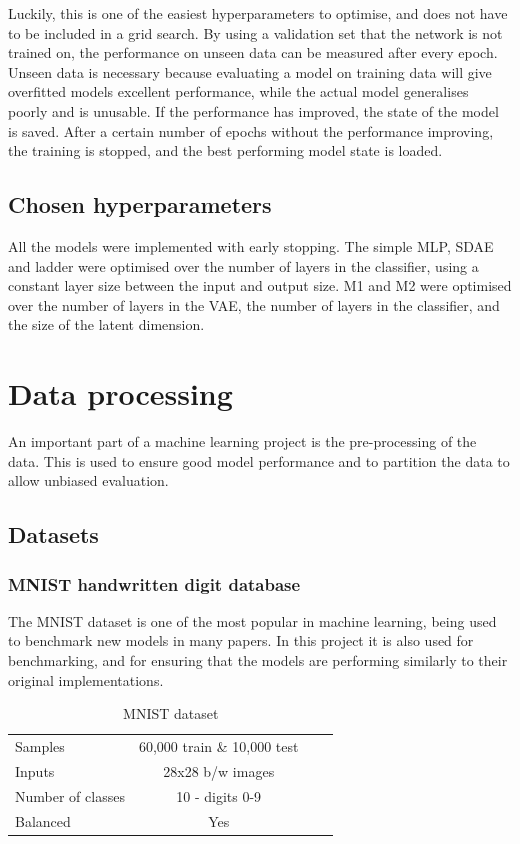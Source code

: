 Luckily, this is one of the easiest hyperparameters to optimise, and does not have to be included in a grid search. 
By using a validation set that the network is not trained on, the performance on unseen data can be measured after 
every epoch. Unseen data is necessary because evaluating a model on training data will give overfitted models excellent performance, 
while the actual model generalises poorly and is unusable.
If the performance has improved, the state of the model is saved. After a certain number of epochs without the performance improving, 
the training is stopped, and the best performing model state is loaded.

\subsection{Chosen hyperparameters}

All the models were implemented with early stopping. The simple MLP, SDAE and ladder were optimised over the number of layers in the classifier, 
using a constant layer size between the input and output size. M1 and M2 were optimised over the number of layers in the VAE, the 
number of layers in the classifier, and the size of the latent dimension.

\section{Data processing}
An important part of a machine learning project is the pre-processing of the data. This is used to ensure good model performance and 
to partition the data to allow unbiased evaluation.

\subsection{Datasets}
\subsubsection{MNIST handwritten digit database}
The MNIST dataset is one of the most popular in machine learning, being used to benchmark new models in many papers. In this project it is 
also used for benchmarking, and for ensuring that the models are performing similarly to their original implementations.
\begin{table}[H]
  \label{tab:mnist}
  \small %
  \centering %
  \begin{tabular}{lccr} %
  \toprule[\heavyrulewidth]
  Samples & 60,000 train \& 10,000 test \\
  Inputs & 28x28 b/w images  \\
  Number of classes & 10 - digits 0-9 \\
  Balanced & Yes \\
  \bottomrule[\heavyrulewidth] 
  \end{tabular}
  \caption{MNIST dataset} 
\end{table}

